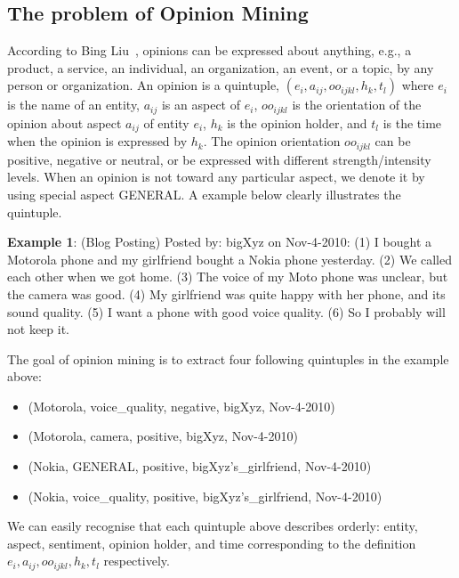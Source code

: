 \documentclass{article}
\begin{document}
\label{sec:sabackground}
\subsection{The problem of Opinion Mining}
According to Bing Liu~\cite{Liu2012}, opinions can be expressed about anything, e.g., a product, a service, an individual, an organization, an event, or a topic, by any person or organization.
An opinion is a quintuple, $(e_i, a_{ij}, oo_{ijkl}, h_k, t_l)$ where $e_i$ is the name of an entity, $a_{ij}$ is an aspect of $e_i$, $oo_{ijkl}$ is the orientation of the opinion about aspect $a_{ij}$ of entity $e_i$, $h_k$ is the opinion holder, and $t_l$ is the time when the opinion is expressed by $h_k$. 
The opinion orientation $oo_{ijkl}$ can be positive, negative or neutral, or be expressed with different strength/intensity levels. 
When an opinion is not toward any particular aspect, we denote it by using special aspect GENERAL.
A example below clearly illustrates the quintuple.

\textbf{Example 1}:
(Blog Posting) Posted by: bigXyz on Nov-4-2010: 
(1) I bought a Motorola phone and my girlfriend bought a Nokia phone yesterday. 
(2) We called each other when we got home. 
(3) The voice of my Moto phone was unclear, but the camera was good. 
(4) My girlfriend was quite happy with her phone, and its sound quality. 
(5) I want a phone with good voice quality. 
(6) So I probably will not keep it.

The goal of opinion mining is to extract four following quintuples in the example above:
\begin{itemize}
	\item (Motorola, voice\_quality, negative, bigXyz, Nov-4-2010)
	\item (Motorola, camera, positive, bigXyz, Nov-4-2010)
	\item (Nokia, GENERAL, positive, bigXyz's\_girlfriend, Nov-4-2010)
	\item (Nokia, voice\_quality, positive, bigXyz's\_girlfriend, Nov-4-2010)
\end{itemize}
We can easily recognise that each quintuple above describes orderly: entity, aspect, sentiment, opinion holder, and time corresponding to the definition $e_i, a_{ij}, oo_{ijkl}, h_k, t_l$ respectively. 
\end{document}

